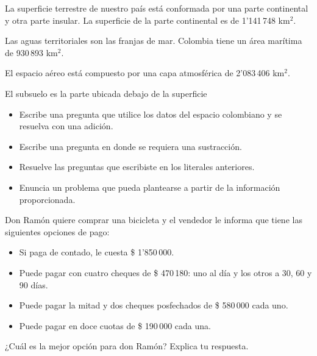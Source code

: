 \documentclass[10pt,twoside]{article}
\begin{document}
\begin{minipage}{.5\textwidth}
La superficie terrestre de nuestro país está conformada por una parte continental y otra parte insular. La superficie de la parte continental es de 1'141\,748 km$^{2}$. 

Las aguas territoriales son las franjas de mar. Colombia tiene un área marítima de 930\,893 km$^{2}$.

El espacio aéreo está compuesto por una capa atmosférica de 2'083\,406 km$^{2}$. 

El subsuelo es la parte ubicada debajo de la superficie
\end{minipage}
\begin{itemize}
\item Escribe una pregunta que utilice los datos del espacio
colombiano y se resuelva con una adición.
\item Escribe una pregunta en donde se requiera una
sustracción.
\item Resuelve las preguntas que escribiste en los literales
anteriores.
\item Enuncia un problema que pueda plantearse a partir de la
información proporcionada.
\end{itemize}
Don Ramón quiere comprar una bicicleta y el vendedor le
informa que tiene las siguientes opciones de pago:
\begin{itemize}
\item Si paga de contado, le cuesta \$ 1'850\,000.
\item Puede pagar con cuatro cheques de \$ 470\,180: uno al
día y los otros a 30, 60 y 90 días.
\item Puede pagar la mitad y dos cheques posfechados de \$
580\,000 cada uno.
\item Puede pagar en doce cuotas de \$ 190\,000 cada una.
\end{itemize}
¿Cuál es la mejor opción para don Ramón? Explica tu
respuesta.
\end{document}
